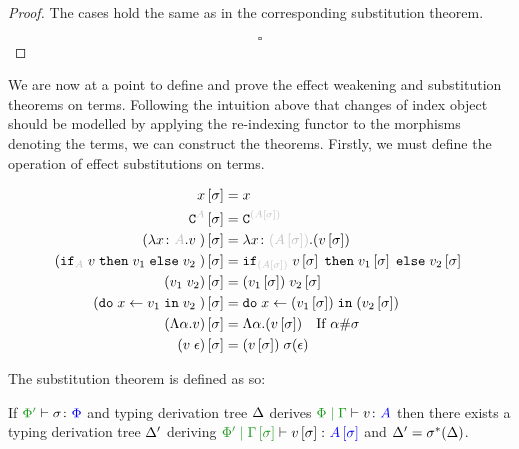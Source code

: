 \documentclass{Report}
\begin{document}
\begin{proof}
    The cases hold the same as in the corresponding substitution theorem.

    $$\square$$
\end{proof}



We are now at a point to define and prove the effect weakening and substitution theorems on terms. Following the intuition above that changes of index object should be modelled by applying the re-indexing functor to the morphisms denoting the terms, we can construct the theorems. Firstly, we must define the operation of effect substitutions on terms.

\begin{align*}
    x\ssi & = x \\
    \const{A}\ssi & = \const{(A\ssi)} \\
    (\lam{x}{A}{v})\ssi &= \lam{x}{(A\ssi)}{(v\ssi)}\\
    (\pifthenelse{A}{v}{v_1}{v_2})\ssi &= \pifthenelse{(A\ssi)}{v\ssi}{v_1\ssi}{v_2\ssi}\\
    (\apply{v_1}{v_2})\ssi&= \apply{(v_1\ssi)}{v_2\ssi}\\
    (\doin{x}{v_1}{v_2})\ssi&= \doin{x}{(v_1\ssi)}{(v_2\ssi)}\\
    (\elam{\a}{v})\ssi & = \elam{\a}{(v\ssi)}\qt{If $\a\#\si$}\\
    (\eapp{v}{\e})\ssi & = \eapp{(v\ssi)}{\si(\e)}\\
\end{align*}

The substitution theorem is defined as so:

\begin{theorem}
    If $\typerelation{\P'}{\si}{\P}$ and typing derivation tree $\Delta$ derives $\gpetyperelation{v}{A}$ then there exists a typing derivation tree  $\Delta'$ deriving $\etyperelation{\P'}{\G\ssi}{v\ssi}{A\ssi}$ and $\Delta' = \sigma^*(\Delta)$.
\end{theorem}
\end{document}
